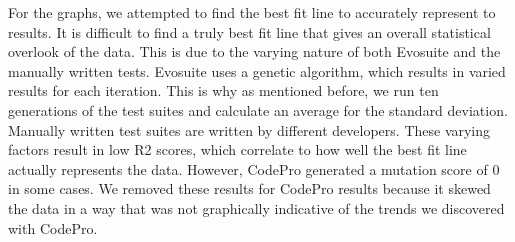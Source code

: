 \documentclass[conference]{IEEEtran}
\begin{document}
For the graphs, we attempted to find the best fit line to accurately represent to results. It is difficult to find a truly best fit line that gives an overall statistical overlook of the data. This is due to the varying nature of both Evosuite and the manually written tests. Evosuite uses a genetic algorithm, which results in varied results for each iteration. This is why as mentioned before, we run ten generations of the test suites and calculate an average for the standard deviation. Manually written test suites are written by different developers. These varying factors result in low  R2 scores, which correlate to how well the best fit line actually represents the data. However, CodePro generated a mutation score of 0 in some cases. We removed these results for CodePro results because it skewed the data in a way that was not graphically indicative of the trends we discovered with CodePro. 
\end{document}
